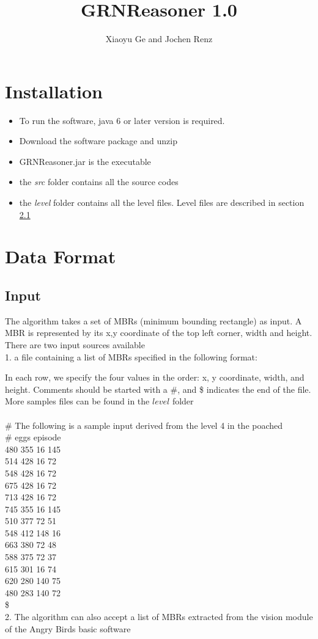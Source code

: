 \documentclass{article}
\title{GRNReasoner 1.0}
\author{Xiaoyu Ge and Jochen Renz}
\begin{document}
\maketitle

\section{Installation}

\begin{itemize}
\item To run the software, java 6 or later version is required.  
\item Download the software package and unzip
\item GRNReasoner.jar is the executable
\item the\textit{ src} folder contains all the source codes
\item the \textit{level} folder contains all the level files. Level files are described in section \ref{input} 
\end{itemize}



\section{Data Format}
\subsection{Input}\label{input}
The algorithm takes a set of MBRs (minimum bounding rectangle) as input. A MBR is represented by its x,y coordinate of the top left corner, width and height. There are two input sources available
\\1. a file containing a list of MBRs specified in the following format:

 In each row, we specify the four values in the order: x, y coordinate, width, and height. Comments should be started with a \#, and \$ indicates the end of the file. More samples files can be found in the $level$ folder
\\\\\# The following is a sample input derived from the level 4 in the poached \\\# eggs episode
\\480 355 16 145
\\514 428 16 72
\\548 428 16 72
\\675 428 16 72
\\713 428 16 72
\\745 355 16 145
\\510 377 72 51 
\\548 412 148 16
\\663 380 72  48
\\588 375 72 37
\\615 301 16 74
\\620 280 140 75
\\480 283 140 72
\\\$ 
\\2. The algorithm can also accept a list of MBRs extracted from the vision module of the Angry Birds basic software 
\end{document}
